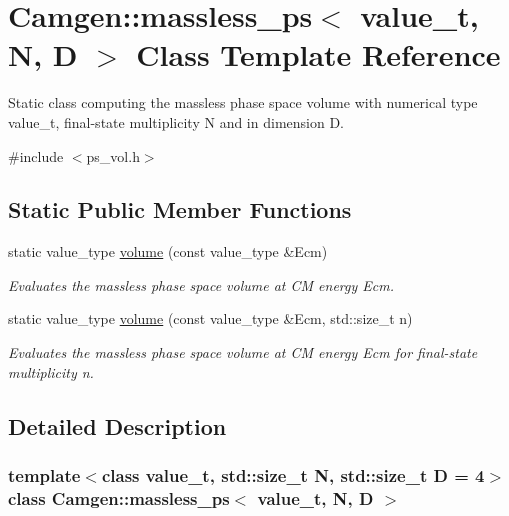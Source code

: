\hypertarget{a00355}{}\section{Camgen\+:\+:massless\+\_\+ps$<$ value\+\_\+t, N, D $>$ Class Template Reference}
\label{a00355}


Static class computing the massless phase space volume with numerical type value\+\_\+t, final-\/state multiplicity N and in dimension D.  




{\ttfamily \#include $<$ps\+\_\+vol.\+h$>$}

\subsection*{Static Public Member Functions}
\begin{DoxyCompactItemize}
\item 
\hypertarget{a00355_a749236374a14eb01e197636c92508cb9}{}static value\+\_\+type \hyperlink{a00355_a749236374a14eb01e197636c92508cb9}{volume} (const value\+\_\+type \&Ecm)\label{a00355_a749236374a14eb01e197636c92508cb9}

\begin{DoxyCompactList}\small\item\em Evaluates the massless phase space volume at C\+M energy Ecm. \end{DoxyCompactList}\item 
static value\+\_\+type \hyperlink{a00355_ae001b3575541b2ba0c0496d64f4e6daa}{volume} (const value\+\_\+type \&Ecm, std\+::size\+\_\+t n)
\begin{DoxyCompactList}\small\item\em Evaluates the massless phase space volume at C\+M energy Ecm for final-\/state multiplicity n. \end{DoxyCompactList}\end{DoxyCompactItemize}


\subsection{Detailed Description}
\subsubsection*{template$<$class value\+\_\+t, std\+::size\+\_\+t N, std\+::size\+\_\+t D = 4$>$class Camgen\+::massless\+\_\+ps$<$ value\+\_\+t, N, D $>$}

